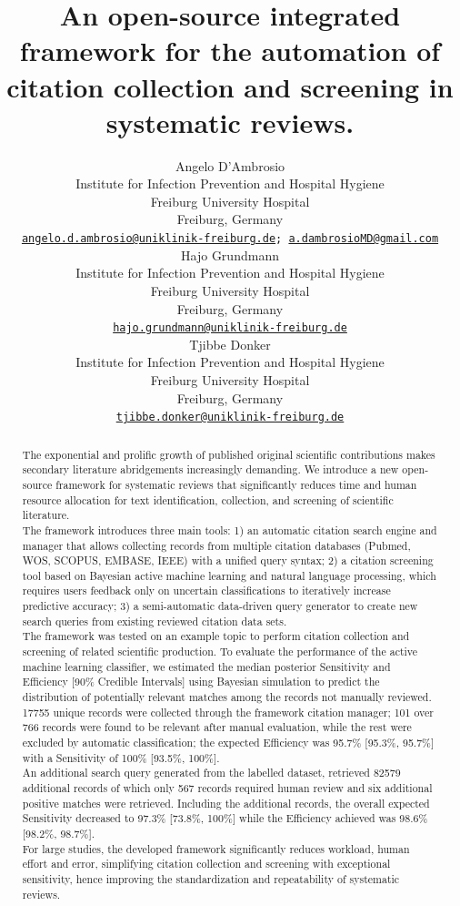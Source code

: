 \documentclass{article}
\title{An open-source integrated framework for the automation of
citation collection and screening in systematic reviews.}
\author{
    Angelo D'Ambrosio
   \\
    Institute for Infection Prevention and Hospital Hygiene \\
    Freiburg University Hospital \\
  Freiburg, Germany \\
  \texttt{\href{mailto:angelo.d.ambrosio@uniklinik-freiburg.de}{\nolinkurl{angelo.d.ambrosio@uniklinik-freiburg.de}};
\href{mailto:a.dambrosioMD@gmail.com}{\nolinkurl{a.dambrosioMD@gmail.com}}} \\
   \And
    Hajo Grundmann
   \\
    Institute for Infection Prevention and Hospital Hygiene \\
    Freiburg University Hospital \\
  Freiburg, Germany \\
  \texttt{\href{mailto:hajo.grundmann@uniklinik-freiburg.de}{\nolinkurl{hajo.grundmann@uniklinik-freiburg.de}}} \\
   \And
    Tjibbe Donker
   \\
    Institute for Infection Prevention and Hospital Hygiene \\
    Freiburg University Hospital \\
  Freiburg, Germany \\
  \texttt{\href{mailto:tjibbe.donker@uniklinik-freiburg.de}{\nolinkurl{tjibbe.donker@uniklinik-freiburg.de}}} \\
  }
\begin{document}
\maketitle

\def\tightlist{}


\begin{abstract}
The exponential and prolific growth of published original scientific
contributions makes secondary literature abridgements increasingly
demanding. We introduce a new open-source framework for systematic
reviews that significantly reduces time and human resource allocation
for text identification, collection, and screening of scientific
literature.\\
The framework introduces three main tools: 1) an automatic citation
search engine and manager that allows collecting records from multiple
citation databases (Pubmed, WOS, SCOPUS, EMBASE, IEEE) with a unified
query syntax; 2) a citation screening tool based on Bayesian active
machine learning and natural language processing, which requires users
feedback only on uncertain classifications to iteratively increase
predictive accuracy; 3) a semi-automatic data-driven query generator to
create new search queries from existing reviewed citation data sets.\\
The framework was tested on an example topic to perform citation
collection and screening of related scientific production. To evaluate
the performance of the active machine learning classifier, we estimated
the median posterior Sensitivity and Efficiency {[}90\% Credible
Intervals{]} using Bayesian simulation to predict the distribution of
potentially relevant matches among the records not manually reviewed.\\
17755 unique records were collected through the framework citation
manager; 101 over 766 records were found to be relevant after manual
evaluation, while the rest were excluded by automatic classification;
the expected Efficiency was 95.7\% {[}95.3\%, 95.7\%{]} with a
Sensitivity of 100\% {[}93.5\%, 100\%{]}.\\
An additional search query generated from the labelled dataset,
retrieved 82579 additional records of which only 567 records required
human review and six additional positive matches were retrieved.
Including the additional records, the overall expected Sensitivity
decreased to 97.3\% {[}73.8\%, 100\%{]} while the Efficiency achieved
was 98.6\% {[}98.2\%, 98.7\%{]}.\\
For large studies, the developed framework significantly reduces
workload, human effort and error, simplifying citation collection and
screening with exceptional sensitivity, hence improving the
standardization and repeatability of systematic reviews.
\end{abstract}
\end{document}
